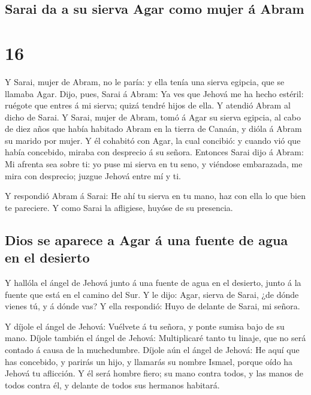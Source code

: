 \hypertarget{sarai-da-a-su-sierva-agar-como-mujer-uxe1-abram}{%
\subsection{Sarai da a su sierva Agar como mujer á
Abram}\label{sarai-da-a-su-sierva-agar-como-mujer-uxe1-abram}}

\hypertarget{section-15}{%
\section{16}\label{section-15}}

 Y Sarai, mujer de Abram, no le paría: y ella tenía una
sierva egipcia, que se llamaba Agar.  Dijo, pues, Sarai á
Abram: Ya ves que Jehová me ha hecho estéril: ruégote que entres á mi
sierva; quizá tendré hijos de ella. Y atendió Abram al dicho de Sarai.
 Y Sarai, mujer de Abram, tomó á Agar su sierva egipcia,
al cabo de diez años que había habitado Abram en la tierra de Canaán, y
dióla á Abram su marido por mujer.  Y él cohabitó con
Agar, la cual concibió: y cuando vió que había concebido, miraba con
desprecio á su señora.  Entonces Sarai dijo á Abram: Mi
afrenta sea sobre ti: yo puse mi sierva en tu seno, y viéndose
embarazada, me mira con desprecio; juzgue Jehová entre mí y ti.

 Y respondió Abram á Sarai: He ahí tu sierva en tu mano,
haz con ella lo que bien te pareciere. Y como Sarai la afligiese, huyóse
de su presencia.

\hypertarget{dios-se-aparece-a-agar-uxe1-una-fuente-de-agua-en-el-desierto}{%
\subsection{Dios se aparece a Agar á una fuente de agua en el
desierto}\label{dios-se-aparece-a-agar-uxe1-una-fuente-de-agua-en-el-desierto}}

 Y hallóla el ángel de Jehová junto á una fuente de agua
en el desierto, junto á la fuente que está en el camino del Sur.
 Y le dijo: Agar, sierva de Sarai, ¿de dónde vienes tú, y
á dónde vas? Y ella respondió: Huyo de delante de Sarai, mi señora.

 Y díjole el ángel de Jehová: Vuélvete á tu señora, y
ponte sumisa bajo de su mano.  Díjole también el ángel de
Jehová: Multiplicaré tanto tu linaje, que no será contado á causa de la
muchedumbre.  Díjole aún el ángel de Jehová: He aquí que
has concebido, y parirás un hijo, y llamarás su nombre Ismael, porque
oído ha Jehová tu aflicción.  Y él será hombre fiero; su
mano contra todos, y las manos de todos contra él, y delante de todos
sus hermanos habitará.

